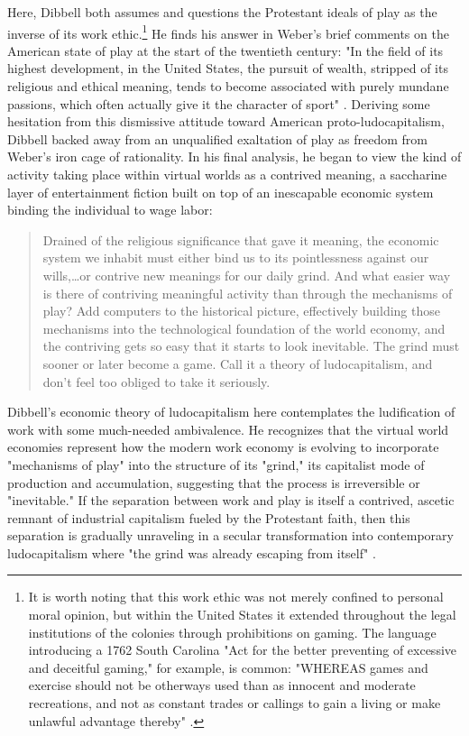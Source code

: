 Here, Dibbell both assumes and questions the Protestant ideals of play as the inverse of its work ethic.\footnote{
  It is worth noting that this work ethic was not merely confined to personal moral opinion, but within the United States it extended throughout the legal institutions of the colonies through prohibitions on gaming. The language introducing a 1762 South Carolina "Act for the better preventing of excessive and deceitful gaming," for example, is common: "WHEREAS games and exercise should not be otherways used than as innocent and moderate recreations, and not as constant trades or callings to gain a living or make unlawful advantage thereby" \autocite[158]{Cooper1838}.
}
He finds his answer in Weber's brief comments on the American state of play at the start of the twentieth century: "In the field of its highest development, in the United States, the pursuit of wealth, stripped of its religious and ethical meaning, tends to become associated with purely mundane passions, which often actually give it the character of sport" \autocite[qtd.~in][298]{Dibbell2007-dd}. Deriving some hesitation from this dismissive attitude toward American proto-ludocapitalism, Dibbell backed away from an unqualified exaltation of play as freedom from Weber's iron cage of rationality. In his final analysis, he began to view the kind of activity taking place within virtual worlds as a contrived meaning, a saccharine layer of entertainment fiction built on top of an inescapable economic system binding the individual to wage labor:
\blockcquote[298--9]{Dibbell2007-dd}{
  Drained of the religious significance that gave it meaning, the economic system we inhabit must either bind us to its pointlessness against our wills,…or contrive new meanings for our daily grind. And what easier way is there of contriving meaningful activity than through the mechanisms of play? Add computers to the historical picture, effectively building those mechanisms into the technological foundation of the world economy, and the contriving gets so easy that it starts to look inevitable. The grind must sooner or later become a game. Call it a theory of ludocapitalism, and don't feel too obliged to take it seriously.
}
Dibbell's economic theory of ludocapitalism here contemplates the ludification of work with some much-needed ambivalence. He recognizes that the virtual world economies represent how the modern work economy is evolving to incorporate "mechanisms of play" into the structure of its "grind," its capitalist mode of production and accumulation, suggesting that the process is irreversible or "inevitable." If the separation between work and play is itself a contrived, ascetic remnant of industrial capitalism fueled by the Protestant faith, then this separation is gradually unraveling in a secular transformation into contemporary ludocapitalism where "the grind was already escaping from itself" \autocite[299]{Dibbell2007-dd}.

